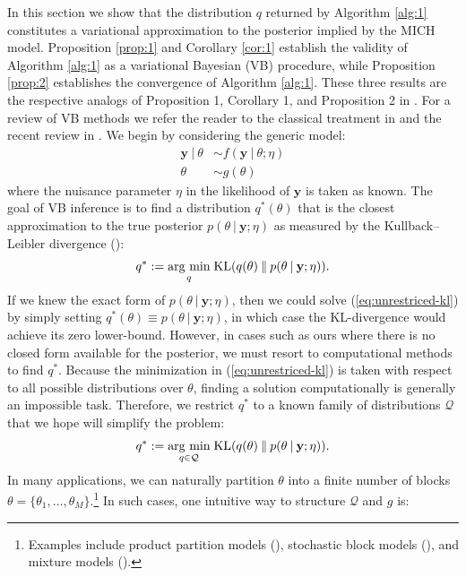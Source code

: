In this section we show that the distribution $q$ returned by Algorithm \ref{alg:1} constitutes a variational approximation to the posterior implied by the MICH model. Proposition \ref{prop:1} and Corollary \ref{cor:1} establish the validity of Algorithm \ref{alg:1} as a variational Bayesian (VB) procedure, while Proposition \ref{prop:2} establishes the convergence of Algorithm \ref{alg:1}. These three results are the respective analogs of Proposition 1, Corollary 1, and Proposition 2 in \cite{Wang20}. For a review of VB methods we refer the reader to the classical treatment in \cite{Jordan99} and the recent review in \cite{Blei17}. We begin by considering the generic model:
\begin{align}
    \mathbf{y} \:|\: \theta &\sim f(\mathbf{y}\:|\: \theta;\eta) \\
    \theta &\sim g(\theta)
\end{align}
where the nuisance parameter $\eta$ in the likelihood of $\mathbf{y}$ is taken as known. The goal of VB inference is to find a distribution $q^*(\theta)$ that is the closest approximation to the true posterior $p(\theta\:|\: \mathbf{y};\eta)$ as measured by the Kullback–Leibler divergence (\citealp{Kullback51}):
\begin{align}\label{eq:unrestriced-kl}
    q^* := \underset{q}{\text{arg min}}  \; \text{KL}( q(\theta) \:\lVert\: p(\theta\:|\: \mathbf{y};\eta)).
\end{align}
If we knew the exact form of $p(\theta\:|\: \mathbf{y};\eta)$, then we could solve (\ref{eq:unrestriced-kl}) by simply setting $q^*(\theta)\equiv p(\theta\:|\: \mathbf{y};\eta)$, in which case the KL-divergence would achieve its zero lower-bound. However, in cases such as ours where there is no closed form available for the posterior, we must resort to computational methods to find $q^*$. Because the minimization in (\ref{eq:unrestriced-kl}) is taken with respect to all possible distributions over $\theta$, finding a solution computationally is generally an impossible task. Therefore, we restrict $q^*$ to a known family of distributions $\mathcal{Q}$ that we hope will simplify the problem:
\begin{align}\label{eq:restriced-kl}
    q^* := \underset{q\in\mathcal{Q}}{\text{arg min}}  \; \text{KL}( q(\theta) \:\lVert\: p(\theta\:|\: \mathbf{y};\eta)).
\end{align}
In many applications, we can naturally partition $\theta$ into a finite number of blocks $\theta = \{\theta_1, \ldots, \theta_M\}$.\footnote{Examples include product partition models (\citealp{Hartigan90, Barry92}), stochastic block models (\citealp{Holland83}), and mixture models (\citealp{Corduneanu01}).} In such cases, one intuitive way to structure $\mathcal{Q}$ and $g$ is:
